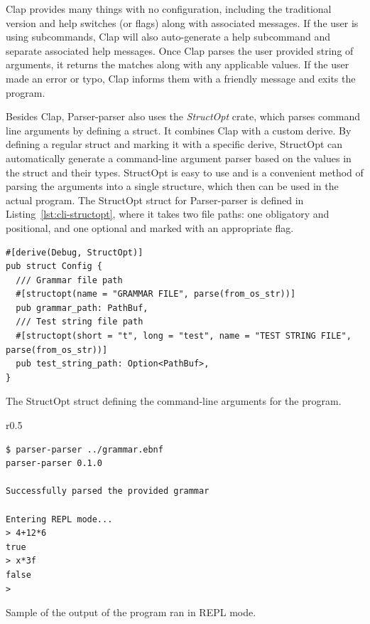\documentclass[english,bachelors,forcepolishlogotype]{wizthesis}
\newcommand{\thisproject}{Parser-parser}
\begin{document}
Clap provides many things with no configuration, including the traditional
version and help switches (or flags) along with associated messages. If the user
is using subcommands, Clap will also auto-generate a help subcommand and
separate associated help messages. Once Clap parses the user provided string of
arguments, it returns the matches along with any applicable values. If the user
made an error or typo, Clap informs them with a friendly message and exits
the program.

Besides Clap, \thisproject{} also uses the \emph{StructOpt} crate, which parses
command line arguments by defining a struct. It combines Clap with a custom
derive. By defining a regular struct and marking it with a specific derive,
StructOpt can automatically generate a command-line argument parser based on the
values in the struct and their types. StructOpt is easy to use and is a
convenient method of parsing the arguments into a single structure, which then
can be used in the actual program. The StructOpt struct for \thisproject{} is
defined in Listing~\ref{lst:cli-structopt}, where it takes two file paths: one
obligatory and positional, and one optional and marked with an appropriate flag.

\begin{listing}[H]
  \begin{verbatim}
#[derive(Debug, StructOpt)]
pub struct Config {
  /// Grammar file path
  #[structopt(name = "GRAMMAR FILE", parse(from_os_str))]
  pub grammar_path: PathBuf,
  /// Test string file path
  #[structopt(short = "t", long = "test", name = "TEST STRING FILE", parse(from_os_str))]
  pub test_string_path: Option<PathBuf>,
}
  \end{verbatim}
  \caption{The StructOpt struct defining the command-line arguments for the
  program.}
  \label{lst:cli-structopt}
\end{listing}

\begin{wraplisting}{r}{0.5\textwidth}
  \begin{verbatim}
$ parser-parser ../grammar.ebnf
parser-parser 0.1.0

Successfully parsed the provided grammar

Entering REPL mode...
> 4+12*6
true
> x*3f
false
>
  \end{verbatim}
  \caption{Sample of the output of the program ran in REPL mode.}
  \label{lst:cli-repl}
\end{wraplisting}
\end{document}
